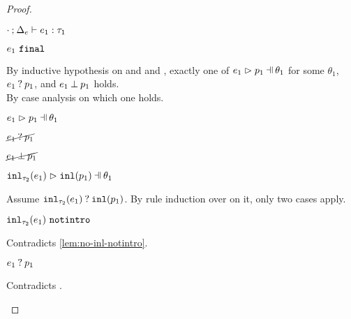 \begin{proof}
\begin{byCases}
\begin{byCases}
\begin{pfsteps*}
        \item $\cdot \mathbin{;} \Delta_e \vdash e_1 : \tau_1$  
        \item $e_1 ~\mathtt{final}$  
        \end{pfsteps*}
        By inductive hypothesis on  and  and , exactly one of $\hpatmatch{e_1}{p_1}{\theta_1}$ for some $\theta_1$, $e_1 \mathbin{?} p_1$, and $e_1 \mathbin{\bot} p_1$ holds.\\
        By case analysis on which one holds.
        \begin{byCases}
        \item[\hpatmatch{e_1}{p_1}{\theta_1}]
            \begin{pfsteps*}
            \item $\hpatmatch{e_1}{p_1}{\theta_1}$  
            \item $\cancel{e_1 \mathbin{?} p_1}$  
            \item $\cancel{e_1 \mathbin{\bot} p_1}$  
            \item $\hpatmatch{\hinl{\tau_2}{e_1}}{\hinlp{p_1}}{\theta_1}$ 
            \end{pfsteps*}
            Assume $\mathtt{inl}_{\tau_2}({e_1}) \mathbin{?} \mathtt{inl}(p_1)$. By rule induction over  on it, only two cases apply.
            \begin{byCases}
            \item[\text{(\ref{rule:MMNotIntro})}]
                \begin{pfsteps*}
                \item $\mathtt{inl}_{\tau_2}({e_1}) ~\mathtt{notintro}$ 
                \end{pfsteps*}
                Contradicts \autoref{lem:no-inl-notintro}.
            \item[\text{(\ref{rule:MMInl})}]
                \begin{pfsteps*}
                \item $e_1 \mathbin{?} p_1$ 
                \end{pfsteps*}
                Contradicts .
            \end{byCases}

\end{byCases}
\end{byCases}
\end{byCases}
\end{proof}
